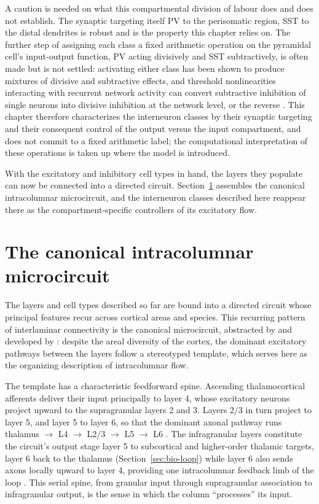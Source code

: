 A caution is needed on what this compartmental division of labour does and does not establish. The synaptic targeting itself  PV to the perisomatic region, SST to the distal dendrites is robust and is the property this chapter relies on. The further step of assigning each class a fixed arithmetic operation on the pyramidal cell's input-output function, PV acting divisively and SST subtractively, is often made but is not settled: activating either class has been shown to produce mixtures of divisive and subtractive effects, and threshold nonlinearities interacting with recurrent network activity can convert subtractive inhibition of single neurons into divisive inhibition at the network level, or the reverse \parencite{seybold2015}. This chapter therefore characterizes the interneuron classes by their synaptic targeting and their consequent control of the output versus the input compartment, and does not commit to a fixed arithmetic label; the computational interpretation of these operations is taken up where the model is introduced.

With the excitatory and inhibitory cell types in hand, the layers they populate can now be connected into a directed circuit. Section~\ref{sec:bio-canonical} assembles the canonical intracolumnar microcircuit, and the interneuron classes described here reappear there as the compartment-specific controllers of its excitatory flow.

\section{The canonical intracolumnar microcircuit}
\label{sec:bio-canonical}

The layers and cell types described so far are bound into a directed circuit whose principal features recur across cortical areas and species. This recurring pattern of interlaminar connectivity is the canonical microcircuit, abstracted by \textcite{douglas1989} and developed by \textcite{douglas2004}: despite the areal diversity of the cortex, the dominant excitatory pathways between the layers follow a stereotyped template, which serves here as the organizing description of intracolumnar flow.

The template has a characteristic feedforward spine. Ascending thalamocortical afferents deliver their input principally to layer 4, whose excitatory neurons project upward to the supragranular layers 2 and 3. Layers 2/3 in turn project to layer 5, and layer 5 to layer 6, so that the dominant axonal pathway runs thalamus $\rightarrow$ L4 $\rightarrow$ L2/3 $\rightarrow$ L5 $\rightarrow$ L6 \parencite{douglas2004, white1989}. The infragranular layers constitute the circuit's output stage  layer 5 to subcortical and higher-order thalamic targets, layer 6 back to the thalamus (Section~\ref{sec:bio-loop})  while layer 6 also sends axons locally upward to layer 4, providing one intracolumnar feedback limb of the loop \parencite{shepherd2018}. This serial spine, from granular input through supragranular association to infragranular output, is the sense in which the column ``processes'' its input.


